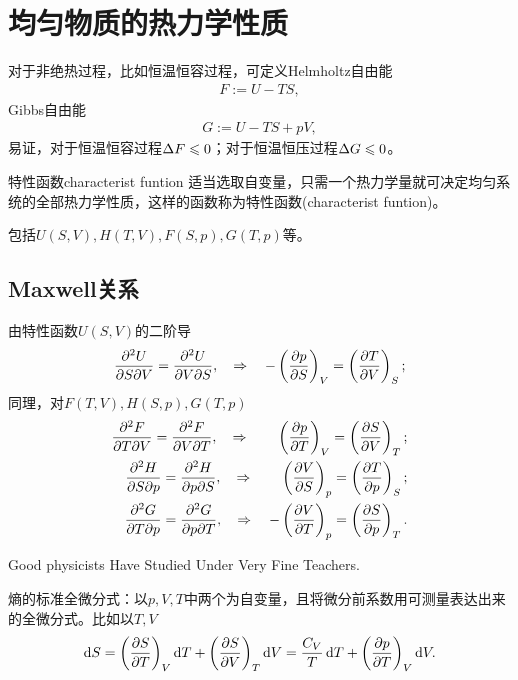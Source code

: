 \section{均匀物质的热力学性质}
对于非绝热过程，比如恒温恒容过程，可定义Helmholtz自由能
\begin{align}
	F:=U-TS,
\end{align}
Gibbs自由能
\begin{align}
	G:=U-TS+pV,
\end{align}
易证，对于恒温恒容过程$\Delta F\leqslant 0$；对于恒温恒压过程$\Delta G\leqslant 0$。
\begin{definition}{特性函数}{characterist funtion}
	适当选取自变量，只需一个热力学量就可决定均匀系统的全部热力学性质，这样的函数称为特性函数(characterist funtion)。
	
	包括$U(S,V),H(T,V),F(S,p),G(T,p)$等。
\end{definition}
\subsection{Maxwell关系}
由特性函数$U(S,V)$的二阶导
\begin{align}
	\pw USV=\pw UVS,\thus-\kh{\pv pS}_V=\kh{\pv TV}_S;
\end{align}
同理，对$F(T,V),H(S,p),G(T,p)$
\begin{align}
	\pw FTV=\pw FVT,\thus\quad\kh{\pv pT}_V=\kh{\pv SV}_T; \\
	\pw HSp=\pw HpS,\thus\quad\kh{\pv VS}_p=\kh{\pv Tp}_S; \\
	\pw GTp=\pw GpT,\thus-\kh{\pv VT}_p=\kh{\pv Sp}_T.
\end{align}
\begin{center}
	\tikzchap Good physicists Have Studied Under Very Fine Teachers.
\end{center}
熵的标准全微分式：以$p,V,T$中两个为自变量，且将微分前系数用可测量表达出来的全微分式。比如以$T,V$
\[
	\d S=\kh{\pv ST}_V\d T+\kh{\pv SV}_T\d V=\frac{C_V}T\d T+\kh{\pv pT}_V\d V.
\]
\iffalse
